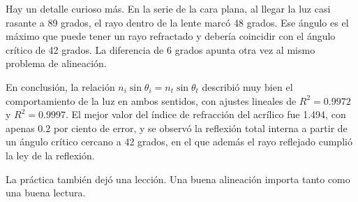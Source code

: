 Hay un detalle curioso más. En la serie de la cara plana, al llegar la luz casi rasante a 89 grados, el rayo dentro de la lente marcó 48 grados. Ese ángulo es el máximo que puede tener un rayo refractado y debería coincidir con el ángulo crítico de 42 grados. La diferencia de 6 grados apunta otra vez al mismo problema de alineación.

En conclusión, la relación $n_i \sin\theta_i = n_t \sin\theta_t$ describió muy bien el comportamiento de la luz en ambos sentidos, con ajustes lineales de $R^2 = 0.9972$ y $R^2 = 0.9997$. El mejor valor del índice de refracción del acrílico fue 1.494, con apenas 0.2 por ciento de error, y se observó la reflexión total interna a partir de un ángulo crítico cercano a 42 grados, en el que además el rayo reflejado cumplió la ley de la reflexión.

La práctica también dejó una lección. Una buena alineación importa tanto como una buena lectura.
